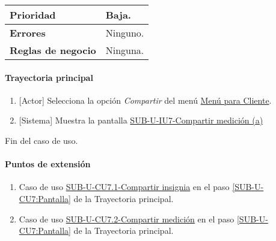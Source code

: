 \begin{longtable}{|J{5cm}|J{10.3cm}|}
		\\ \hline 
	\textbf{Prioridad} & 
		Baja. \\ \hline
	\textbf{Errores} & Ninguno.
		\\ \hline
	\textbf{Reglas de negocio} & Ninguna.
		 \\ \hline
\end{longtable}

\paragraph{Trayectoria principal}
	\begin{enumerate}
		\item {[Actor]} Selecciona la opción \textit{Compartir} del menú \hyperref[fig:menu-cliente]{Menú para Cliente}.
		\item \label{SUB-U-CU7:Pantalla} {[Sistema]} Muestra la pantalla \hyperref[fig:sub-u-iu7.a]{SUB-U-IU7-Compartir medición (a)}
	\end{enumerate}
	Fin del caso de uso.


\paragraph{Puntos de extensión} \label{SUB-U-CU7:PE}
\begin{enumerate}[label=PE\arabic*.]
	\item Caso de uso \hyperref[SUB-U-CU7.1]{SUB-U-CU7.1-Compartir insignia} en el paso \ref{SUB-U-CU7:Pantalla} de la Trayectoria principal.
	\item Caso de uso \hyperref[SUB-U-CU7.2]{SUB-U-CU7.2-Compartir medición} en el paso \ref{SUB-U-CU7:Pantalla} de la Trayectoria principal.
\end{enumerate}
